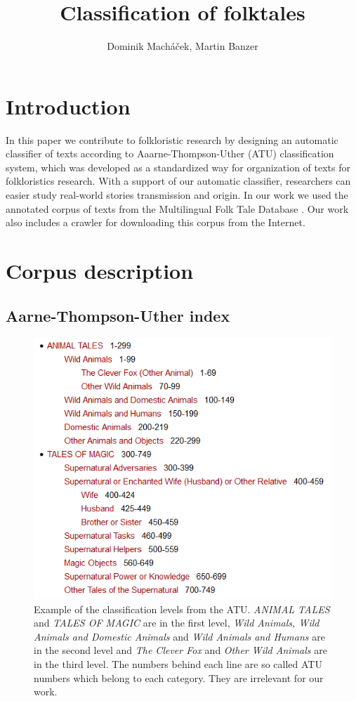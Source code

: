 \documentclass[a4paper]{article}
\title{Classification of folktales}
\author{Dominik Macháček, Martin Banzer}
\begin{document}
\maketitle



\section{Introduction}
In this paper we contribute to folkloristic research by designing an
automatic classifier of texts according to Aaarne-Thompson-Uther (ATU)
classification system, which was developed as a standardized way for
organization of texts for folkloristics research. With a support of our automatic classifier,
researchers can easier study real-world stories transmission and origin.
In our work we used the annotated
corpus of texts from the Multilingual Folk Tale Database \cite{mftd}. Our work also includes a crawler for downloading this corpus from the Internet.


\section{Corpus description}

\subsection{Aarne-Thompson-Uther index}


\begin{figure}
\centering
\includegraphics[width=0.9\linewidth]{random/ATU.PNG}
\caption{Example of the classification levels from the ATU. \textit{ANIMAL TALES} and \textit{TALES OF MAGIC} are in the first level, \textit{Wild Animals, Wild Animals and Domestic Animals} and \textit{Wild Animals and Humans} are in the second level and \textit{The Clever Fox} and \textit{Other Wild Animals} are in the third level. The numbers behind each line are so called ATU numbers which belong to each category. They are irrelevant for our work.}
\label{fig:atu}
\end{figure}
\end{document}
